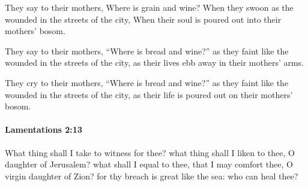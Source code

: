 			\begin{versebox}
					\item[BHS] 
					\item[LXX] 
					\item[ASV] They say to their mothers, Where is grain and wine? When they swoon as the wounded in the streets of the city, When their soul is poured out into their mothers' bosom.
					\item[NIV] They say to their mothers, “Where is bread and wine?” as they faint like the wounded in the streets of the city, as their lives ebb away in their mothers’ arms.
					\item[NRSV] They cry to their mothers, “Where is bread and wine?” as they faint like the wounded in the streets of the city, as their life is poured out on their mothers’ bosom.
			\end{versebox}

		\paragraph{Lamentations 2:13} %
			\label{LAMENTATIONS-2-13}

			What thing shall I take to witness for thee? what thing shall I liken to thee, O daughter of Jerusalem? what shall I equal to thee, that I may comfort thee, O virgin daughter of Zion? for thy breach is great like the sea: who can heal thee?

